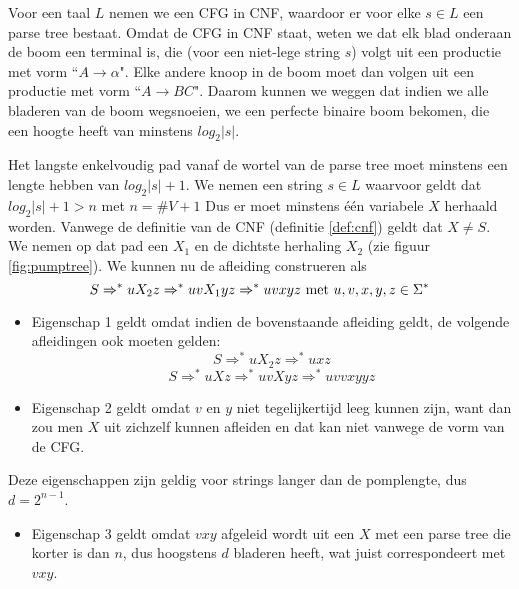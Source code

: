   Voor een taal $L$ nemen we een CFG in CNF, waardoor er voor elke $s \in L$ een parse tree bestaat. Omdat de CFG in CNF staat, weten we dat elk blad onderaan de boom een terminal is, die (voor een niet-lege string $s$) volgt uit een productie met vorm ``$A \rightarrow \alpha$". Elke andere knoop in de boom moet dan volgen uit een productie met vorm ``$A \rightarrow BC$". Daarom kunnen we weggen dat indien we alle bladeren van de boom wegsnoeien, we een perfecte binaire boom bekomen, die een hoogte heeft van minstens $log_2|s|$.
  
  Het langste enkelvoudig pad vanaf de wortel van de parse tree moet minstens een lengte hebben van $log_2|s| + 1$. We nemen een string $s \in L$ waarvoor geldt dat $log_2|s| + 1 > n$ met $n = \#V + 1$ Dus er moet minstens \'e\'en variabele $X$ herhaald worden. Vanwege de definitie van de CNF (definitie \ref{def:cnf}) geldt dat $X \neq S$. We nemen op dat pad een $X_1$ en de dichtste herhaling $X_2$ (zie figuur \ref{fig:pumptree}). We kunnen nu de afleiding construeren als
  \begin{equation*}
  S \Rightarrow^* uX_2z \Rightarrow^* uvX_1yz \Rightarrow^* uvxyz \text{ met }u,v,x,y,z \in \Sigma^*
  \end{equation*}
  
  \begin{itemize}
  \item Eigenschap 1 geldt omdat indien de bovenstaande afleiding geldt, de volgende afleidingen ook moeten gelden:
  \begin{equation*}
  S \Rightarrow^* uX_2z \Rightarrow^* uxz
  \end{equation*}
  \begin{equation*}
  S \Rightarrow^* uXz \Rightarrow^* uvXyz \Rightarrow^* uvvxyyz
  \end{equation*}
  \item Eigenschap 2 geldt omdat $v$ en $y$ niet tegelijkertijd leeg kunnen zijn, want dan zou men $X$ uit zichzelf kunnen afleiden en dat kan niet vanwege de vorm van de CFG.
  \end{itemize}
  
  Deze eigenschappen zijn geldig voor strings langer dan de pomplengte, dus $d = 2^{n-1}$.
  
  \begin{itemize}
  \item Eigenschap 3 geldt omdat $vxy$ afgeleid wordt uit een $X$ met een parse tree die korter is dan $n$, dus hoogstens $d$ bladeren heeft, wat juist correspondeert met $vxy$.
  \end{itemize}
